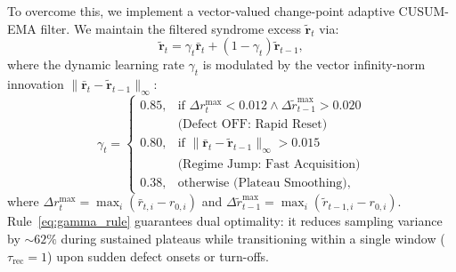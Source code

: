 \documentclass[aps,prxquantum,reprint,superscriptaddress,floatfix,nofootinbib]{revtex4-2}
\begin{document}
To overcome this, we implement a vector-valued change-point adaptive CUSUM-EMA filter. We maintain the filtered syndrome excess $\tilde{\mathbf{r}}_t$ via:
\begin{equation}
    \tilde{\mathbf{r}}_t = \gamma_t \bar{\mathbf{r}}_t + (1 - \gamma_t) \tilde{\mathbf{r}}_{t-1},
\end{equation}
where the dynamic learning rate $\gamma_t$ is modulated by the vector infinity-norm innovation $\|\bar{\mathbf{r}}_t - \tilde{\mathbf{r}}_{t-1}\|_\infty$:
\begin{equation}
    \gamma_t = \begin{cases}
        0.85, & \text{if } \Delta r^{\max}_t < 0.012 \land \Delta \tilde{r}^{\max}_{t-1} > 0.020 \\
              & \text{(Defect OFF: Rapid Reset)} \\[4pt]
        0.80, & \text{if } \|\bar{\mathbf{r}}_t - \tilde{\mathbf{r}}_{t-1}\|_\infty > 0.015 \\
              & \text{(Regime Jump: Fast Acquisition)} \\[4pt]
        0.38, & \text{otherwise (Plateau Smoothing)},
    \end{cases}
    \label{eq:gamma_rule}
\end{equation}
where $\Delta r^{\max}_t = \max_i (\bar{r}_{t, i} - r_{0, i})$ and $\Delta \tilde{r}^{\max}_{t-1} = \max_i (\tilde{r}_{t-1, i} - r_{0, i})$. Rule~\eqref{eq:gamma_rule} guarantees dual optimality: it reduces sampling variance by $\sim 62\%$ during sustained plateaus while transitioning within a single window ($\tau_{\text{rec}} = 1$) upon sudden defect onsets or turn-offs.
\end{document}
